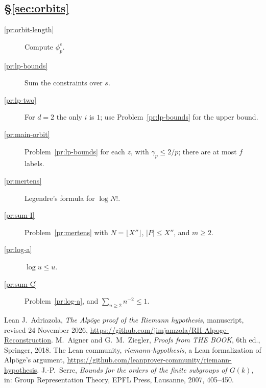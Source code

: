 \documentclass[reqno]{amsart}
\theoremstyle{definition}
\theoremstyle{plain}
\theoremstyle{remark}
\begin{document}
\subsection*{\S\ref{sec:orbits}}
\begin{description}
\item[\ref{pr:orbit-length}] Compute \(\phi_p^e\).
\item[\ref{pr:lp-bounds}] Sum the constraints over \(s\).
\item[\ref{pr:lp-two}] For \(d=2\) the only \(i\) is \(1\); use Problem~\ref{pr:lp-bounds} for the upper bound.
\item[\ref{pr:main-orbit}] Problem~\ref{pr:lp-bounds} for each \(z\), with \(\gamma_p\le2/p\); there are at most \(f\) labels.
\item[\ref{pr:mertens}] Legendre's formula for \(\log N!\).
\item[\ref{pr:sum-I}] Problem~\ref{pr:mertens} with \(N=\lfloor X''\rfloor\), \(\lvert P\rvert\le X''\), and \(m\ge2\).
\item[\ref{pr:log-a}] \(\log u\le u\).
\item[\ref{pr:sum-C}] Problem~\ref{pr:log-a}, and \(\sum_{n\ge2}n^{-2}\le1\).
\end{description}

\begin{thebibliography}{Lean}
  J.~Adriazola, \emph{The Alp\"oge proof of the Riemann hypothesis}, manuscript, revised 24 November 2026, \url{https://github.com/jimjamzola/RH-Alpoge-Reconstruction}.
  M.~Aigner and G.~M.~Ziegler, \emph{Proofs from THE BOOK}, 6th ed., Springer, 2018.
 The Lean community, \emph{riemann-hypothesis}, a Lean formalization of Alp\"oge's argument, \url{https://github.com/leanprover-community/riemann-hypothesis}.
  J.-P.~Serre, \emph{Bounds for the orders of the finite subgroups of \(G(k)\)}, in: Group Representation Theory, EPFL Press, Lausanne, 2007, 405--450.
\end{thebibliography}
\end{document}
